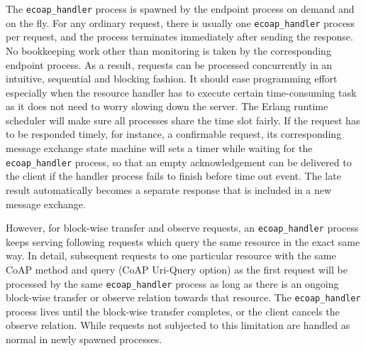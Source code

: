 The \verb|ecoap_handler| process is spawned by the endpoint process on demand and on the fly. For any ordinary request, there is usually one \verb|ecoap_handler| process per request, and the process terminates immediately after sending the response. No  bookkeeping work other than monitoring is taken by the corresponding endpoint process. As a result, requests can be processed concurrently in an intuitive, sequential and blocking fashion. It should ease programming effort especially when the resource handler has to execute certain time-consuming task as it does not need to worry slowing down the server. The Erlang runtime scheduler will make sure all processes share the time slot fairly. If the request has to be responded timely, for instance, a confirmable request, its corresponding message exchange state machine will sets a timer while waiting for the \verb|ecoap_handler| process, so that an empty acknowledgement can be delivered to the client if the handler process fails to finish before time out event. The late result automatically becomes a separate response that is included in a new message exchange. 

However, for block-wise transfer and observe requests, an \verb|ecoap_handler| process keeps serving following requests which query the same resource in the exact same way. In detail, subsequent requests to one particular resource with the same CoAP method and query (CoAP Uri-Query option) as the first request will be processed by the same \verb|ecoap_handler| process as long as there is an ongoing block-wise transfer or observe relation towards that resource. The \verb|ecoap_handler| process lives until the block-wise transfer completes, or the client cancels the observe relation. While requests not subjected to this limitation are handled as normal in newly spawned processes.

